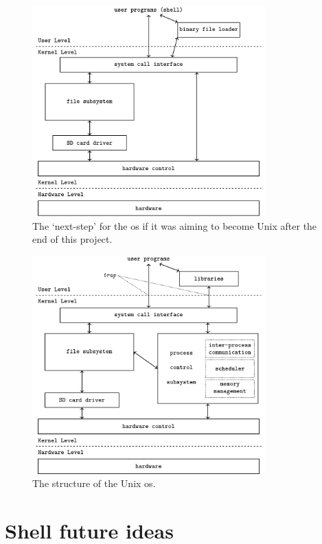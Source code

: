 \documentclass{article}
\begin{document}
\begin{figure}[H]
    \centering
    \includegraphics[width=0.8\textwidth]{build/nextstep-block-diagram.pdf}
    \caption{The `next-step' for the \gls{os} if it was aiming to become Unix
    after the end of this project.}
    \label{fig:appendix_nextstep_block_diagram}
\end{figure}

\begin{figure}[H]
    \centering
    \includegraphics[width=0.8\textwidth]{build/os-block-diagram.pdf}
    \caption{The structure of the Unix \gls{os}.}
    \label{fig:appendix_os_block_diagram}
\end{figure}

\section{Shell future ideas}
\end{document}

